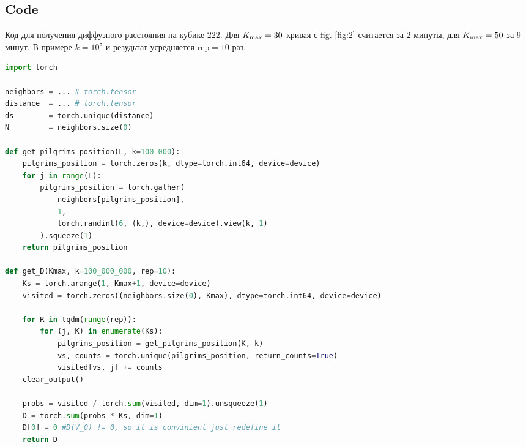 \begin{widetext}
\section{Code} \label{app:codesP}

Код для получения диффузного расстояния на кубике 222. Для $K_{\textnormal{max}} = 30$ кривая с fig. \ref{fig:2} считается за 2 минуты, для $K_{\textnormal{max}} = 50$ за 9 минут. В примере $k=10^{8}$ и резудьтат усредняется $\text{rep}=10$ раз.

\begin{lstlisting}[language=Python]
import torch

neighbors = ... # torch.tensor
distance  = ... # torch.tensor
ds        = torch.unique(distance)
N         = neighbors.size(0)

def get_pilgrims_position(L, k=100_000):
    pilgrims_position = torch.zeros(k, dtype=torch.int64, device=device) 
    for j in range(L):
        pilgrims_position = torch.gather(
            neighbors[pilgrims_position], 
            1, 
            torch.randint(6, (k,), device=device).view(k, 1)
        ).squeeze(1)
    return pilgrims_position

def get_D(Kmax, k=100_000_000, rep=10):
    Ks = torch.arange(1, Kmax+1, device=device)
    visited = torch.zeros((neighbors.size(0), Kmax), dtype=torch.int64, device=device)
    
    for R in tqdm(range(rep)):
        for (j, K) in enumerate(Ks):
            pilgrims_position = get_pilgrims_position(K, k)
            vs, counts = torch.unique(pilgrims_position, return_counts=True)
            visited[vs, j] += counts
    clear_output()
    
    probs = visited / torch.sum(visited, dim=1).unsqueeze(1)
    D = torch.sum(probs * Ks, dim=1)
    D[0] = 0 #D(V_0) != 0, so it is convinient just redefine it
    return D
\end{lstlisting}
\end{widetext}
